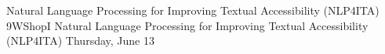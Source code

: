 \begin{wsschedule}
{Natural Language Processing for Improving Textual Accessibility (NLP4ITA)}
{9}{WShopI}
{Natural Language Processing for Improving Textual Accessibility (NLP4ITA)}
{Thursday, June 13}{\WShopLocI}

\end{wsschedule}
